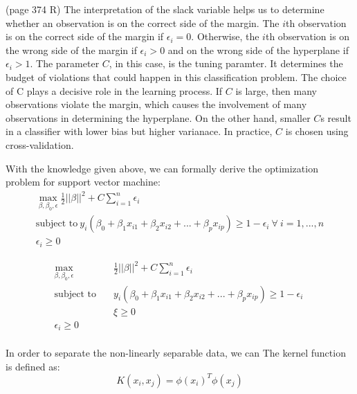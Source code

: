 (page 374 R)
The interpretation of the slack variable helps us to determine whether an observation is on the correct side of the margin.
The $i$th observation is on the correct side of the margin if $\epsilon_i = 0$. Otherwise, 
the $i$th observation is on the wrong side of the margin if $\epsilon_i > 0$ and on the wrong side of the hyperplane
if $\epsilon_i > 1$. The parameter $C$, in this case, is the tuning paramter. It determines the budget of violations
that could happen in this classification problem. The choice of C plays a decisive role in the learning process.
If $C$ is large, then many observations violate the margin, which causes the involvement of many observations in 
determining the hyperplane. On the other hand, smaller $C$s result in a classifier with lower bias but higher varianace.
In practice, $C$ is chosen using cross-validation. 

With the knowledge given above, we can formally derive the optimization problem for support vector machine:
\begin{equation}
    \begin{aligned}
    \max_{\beta, \beta_0, \epsilon} \frac12{||\beta||}^2 + C\sum_{i=1}^n \epsilon_i \\
    \text{subject to}\  y_i(\beta_0 + \beta_1x_{i1} + \beta_2x_{i2} + ... + \beta_px_{ip}) \geq 1 - \epsilon_i\  \forall\ i = 1, ..., n\\
    \epsilon_i \geq 0
    \end{aligned}
\end{equation}

\begin{equation}
\begin{aligned}
\max_{\beta, \beta_0, \epsilon} \quad & \frac12{||\beta||}^2 + C\sum_{i=1}^n \epsilon_i\\
\textrm{subject to} \quad & y_i(\beta_0 + \beta_1x_{i1} + \beta_2x_{i2} + ... + \beta_px_{ip}) \geq 1 - \epsilon_i\ \\
  &\xi\geq0    \\
  \epsilon_i \geq 0 \\
\end{aligned}
\end{equation}


In order to separate the non-linearly separable data, we can 
The kernel function is defined as:
\begin{equation}
    K(x_i, x_j) = \phi(x_i)^T \phi(x_j)
\end{equation}
